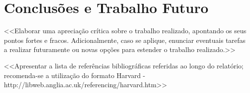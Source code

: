 \documentclass[a4paper,12pt]{scrreprt}
\begin{document}

\chapter{Conclusões e Trabalho Futuro}
    <<Elaborar uma apreciação crítica sobre o trabalho realizado, apontando os seus pontos fortes e fracos. Adicionalmente, caso se aplique, enunciar eventuais tarefas a realizar futuramente ou novas opções para estender o trabalho realizado.>>




\renewcommand\bibname{Referências}

\begin{thebibliography}{9}
<<Apresentar a lista de referências bibliográficas referidas ao longo do relatório; recomenda-se a utilização do formato Harvard - http://libweb.anglia.ac.uk/referencing/harvard.htm>>
\end{thebibliography}




\renewcommand{\nomname}{Lista de Siglas e Acrónimos}

\renewcommand{\nompreamble}{<<Apresentar uma lista com todas as siglas e acrónimos utilizados durante a realização do trabalho. O formato base para esta lista deverá ser da forma como abaixo se apresenta.>>}
\end{document}
